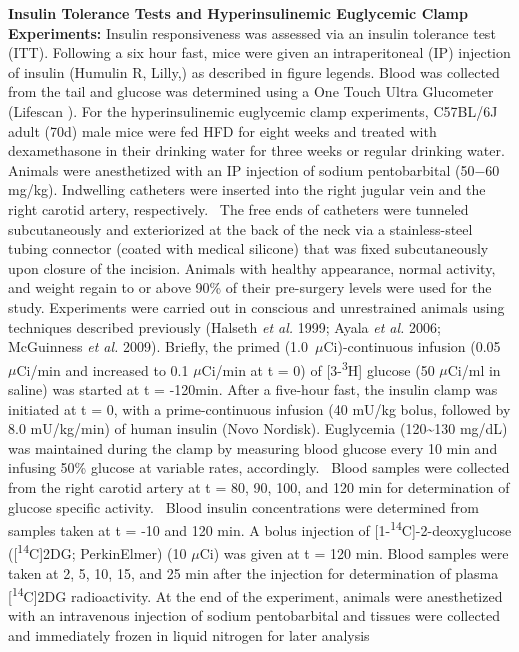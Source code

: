 \documentclass[11pt]{article} %
\begin{document}
\textbf{Insulin Tolerance Tests and Hyperinsulinemic Euglycemic Clamp
Experiments:} Insulin responsiveness was assessed via an insulin
tolerance test (ITT). Following a six hour fast, mice were given an
intraperitoneal (IP) injection of insulin (Humulin R, Lilly,) as
described in figure legends. Blood was collected from the tail and
glucose was determined using a One Touch Ultra Glucometer (Lifescan ).
For the hyperinsulinemic euglycemic clamp experiments, C57BL/6J adult
(70d) male mice were fed HFD for eight weeks and treated with
dexamethasone in their drinking water for three weeks or regular
drinking water. Animals were anesthetized with an IP injection of sodium
pentobarbital (50−60 mg/kg). Indwelling catheters were inserted into the
right jugular vein and the right carotid artery, respectively.~ The free
ends of catheters were tunneled subcutaneously and exteriorized at the
back of the neck via a stainless-steel tubing connector (coated with
medical silicone) that was fixed subcutaneously upon closure of the
incision. Animals with healthy appearance, normal activity, and weight
regain to or above 90\% of their pre-surgery levels were used for the
study. Experiments were carried out in conscious and unrestrained
animals using techniques described previously (Halseth \emph{et al.}
1999; Ayala \emph{et al.} 2006; McGuinness \emph{et al.} 2009). Briefly,
the primed (1.0~$\mu$Ci)-continuous infusion (0.05~$\mu$Ci/min and increased to
0.1 $\mu$Ci/min at t = 0) of {[}3-\textsuperscript{3}H{]} glucose (50 $\mu$Ci/ml
in saline) was started at t = -120min. After a five-hour fast, the
insulin clamp was initiated at t = 0, with a prime-continuous infusion
(40 mU/kg bolus, followed by 8.0 mU/kg/min) of human insulin (Novo
Nordisk). Euglycemia (120\textasciitilde{}130 mg/dL) was maintained
during the clamp by measuring blood glucose every 10 min and infusing
50\% glucose at variable rates, accordingly.~ Blood samples were
collected from the right carotid artery at t = 80, 90, 100, and 120 min
for determination of glucose specific activity.~ Blood insulin
concentrations were determined from samples taken at t = -10 and 120
min. A bolus injection of {[}1-\textsuperscript{14}C{]}-2-deoxyglucose
({[}\textsuperscript{14}C{]}2DG; PerkinElmer) (10 $\mu$Ci) was given at t =
120 min. Blood samples were taken at 2, 5, 10, 15, and 25 min after the
injection for determination of plasma {[}\textsuperscript{14}C{]}2DG
radioactivity. At the end of the experiment, animals were anesthetized
with an intravenous injection of sodium pentobarbital and tissues were
collected and immediately frozen in liquid nitrogen for later analysis
\end{document}

